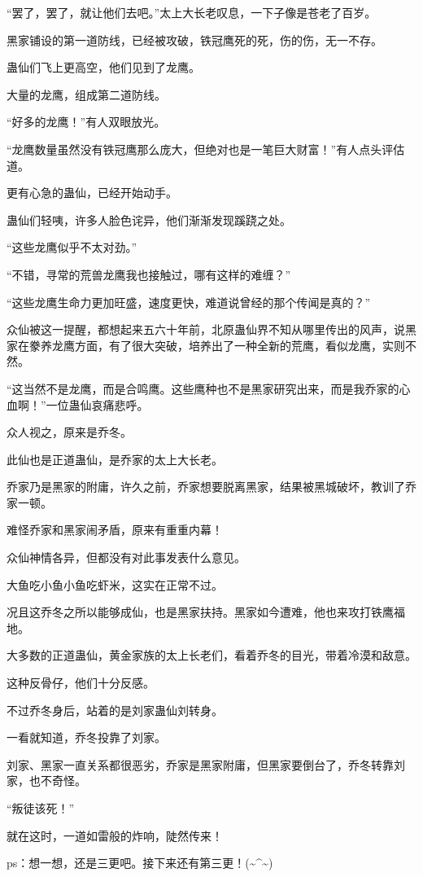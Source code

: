 \begin{this_body}
“罢了，罢了，就让他们去吧。”太上大长老叹息，一下子像是苍老了百岁。

黑家铺设的第一道防线，已经被攻破，铁冠鹰死的死，伤的伤，无一不存。

蛊仙们飞上更高空，他们见到了龙鹰。

大量的龙鹰，组成第二道防线。

“好多的龙鹰！”有人双眼放光。

“龙鹰数量虽然没有铁冠鹰那么庞大，但绝对也是一笔巨大财富！”有人点头评估道。

更有心急的蛊仙，已经开始动手。

蛊仙们轻咦，许多人脸色诧异，他们渐渐发现蹊跷之处。

“这些龙鹰似乎不太对劲。”

“不错，寻常的荒兽龙鹰我也接触过，哪有这样的难缠？”

“这些龙鹰生命力更加旺盛，速度更快，难道说曾经的那个传闻是真的？”

众仙被这一提醒，都想起来五六十年前，北原蛊仙界不知从哪里传出的风声，说黑家在豢养龙鹰方面，有了很大突破，培养出了一种全新的荒鹰，看似龙鹰，实则不然。

“这当然不是龙鹰，而是合鸣鹰。这些鹰种也不是黑家研究出来，而是我乔家的心血啊！”一位蛊仙哀痛悲呼。

众人视之，原来是乔冬。

此仙也是正道蛊仙，是乔家的太上大长老。

乔家乃是黑家的附庸，许久之前，乔家想要脱离黑家，结果被黑城破坏，教训了乔家一顿。

难怪乔家和黑家闹矛盾，原来有重重内幕！

众仙神情各异，但都没有对此事发表什么意见。

大鱼吃小鱼小鱼吃虾米，这实在正常不过。

况且这乔冬之所以能够成仙，也是黑家扶持。黑家如今遭难，他也来攻打铁鹰福地。

大多数的正道蛊仙，黄金家族的太上长老们，看着乔冬的目光，带着冷漠和敌意。

这种反骨仔，他们十分反感。

不过乔冬身后，站着的是刘家蛊仙刘转身。

一看就知道，乔冬投靠了刘家。

刘家、黑家一直关系都很恶劣，乔家是黑家附庸，但黑家要倒台了，乔冬转靠刘家，也不奇怪。

“叛徒该死！”

就在这时，一道如雷般的炸响，陡然传来！

ps：想一想，还是三更吧。接下来还有第三更！(\~{}\^{}\~{})

\end{this_body}

